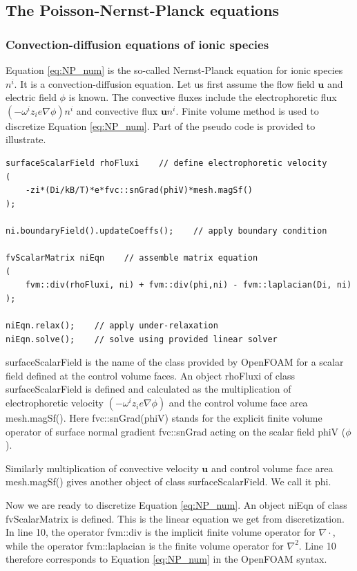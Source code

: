 \subsection{The Poisson-Nernst-Planck equations}
\subsubsection{Convection-diffusion equations of ionic species}
Equation \ref{eq:NP_num} is the so-called Nernst-Planck equation for ionic species $n^i$. It is a convection-diffusion equation. Let us first assume the flow field $\mathbf{u}$ and electric field $\phi$ is known. The convective fluxes include the electrophoretic flux $(-\omega^iz_ie\nabla\phi)n^i$ and convective flux $\mathbf{u}n^i$. Finite volume method is used to discretize Equation \ref{eq:NP_num}. Part of the pseudo code is provided to illustrate.

\begin{lstlisting}
surfaceScalarField rhoFluxi    // define electrophoretic velocity
(
	-zi*(Di/kB/T)*e*fvc::snGrad(phiV)*mesh.magSf()
);

ni.boundaryField().updateCoeffs();    // apply boundary condition

fvScalarMatrix niEqn    // assemble matrix equation
(
    fvm::div(rhoFluxi, ni) + fvm::div(phi,ni) - fvm::laplacian(Di, ni)
);  
      
niEqn.relax();    // apply under-relaxation
niEqn.solve();    // solve using provided linear solver
\end{lstlisting}

\textsf{surfaceScalarField} is the name of the class provided by OpenFOAM for a scalar field defined at the control volume faces. An object \textsf{rhoFluxi} of class \textsf{surfaceScalarField} is defined and calculated as the multiplication of electrophoretic velocity $(-\omega^iz_ie\nabla\phi)$ and the control volume face area \textsf{mesh.magSf()}. Here \textsf{fvc::snGrad(phiV)} stands for the explicit finite volume operator of surface normal gradient \textsf{fvc::snGrad} acting on the scalar field \textsf{phiV} ($\phi$). 

Similarly multiplication of convective velocity $\mathbf{u}$ and control volume face area \textsf{mesh.magSf()} gives another object of class \textsf{surfaceScalarField}. We call it \textsf{phi}.

Now we are ready to discretize Equation \ref{eq:NP_num}. An object \textsf{niEqn} of class \textsf{fvScalarMatrix} is defined. This is the linear equation we get from discretization. In line 10, the operator \textsf{fvm::div} is the implicit finite volume operator for $\nabla \cdot$, while the operator \textsf{fvm::laplacian} is the finite volume operator for $\nabla^2$. Line 10 therefore corresponds to Equation \ref{eq:NP_num} in the OpenFOAM syntax.

